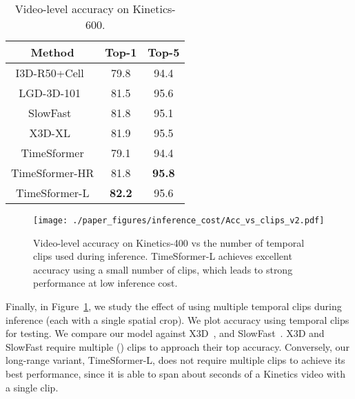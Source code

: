 \documentclass{article}
\begin{document}
 \begin{table}
\centering
{\scriptsize
 \begin{tabular}{c c c }
 \hline
{Method} & {Top-1} & {Top-5} \\ 
 \hline
I3D-R50+Cell~\cite{DBLP:conf/eccv/WangXNPRAKH20} & 79.8 & 94.4\\
LGD-3D-101~\cite{qiu2019learning} & 81.5 & 95.6\\ 
SlowFast~\cite{slowfast} & 81.8 & 95.1\\
X3D-XL~\cite{feichtenhofer2020x3d} & 81.9 & 95.5\\
\hline
TimeSformer & 79.1 & 94.4\\
TimeSformer-HR & 81.8 & \bf 95.8\\
TimeSformer-L & \bf 82.2 & 95.6\\
 \hline
 \end{tabular}
 }
\vspace{-0.1cm}
\caption{{Video-level accuracy on Kinetics-600}.\vspace{-0.1cm}} \label{k600_results_table}
 \end{table}
 
 

\begin{figure}
\begin{center}
\texttt{[image: ./paper\_figures/inference\_cost/Acc\_vs\_clips\_v2.pdf]}
\end{center}
\vspace{-0.4cm}
        \caption{Video-level accuracy on Kinetics-400 vs the number of temporal clips used during inference. TimeSformer-L achieves excellent accuracy using a small number of clips, which leads to strong performance at low inference cost.\vspace{-0.0cm}}
\label{inference_cost_fig}
\end{figure}





Finally, in Figure~\ref{inference_cost_fig}, we study the effect of using multiple temporal clips during inference (each with a single spatial crop). We plot accuracy using  temporal clips for testing. We compare our model against X3D~\cite{feichtenhofer2020x3d}, and SlowFast~\cite{slowfast}. X3D and SlowFast require multiple () clips to approach their top accuracy. Conversely, our long-range variant, TimeSformer-L, does not require multiple clips to achieve its best performance, since it is able to span about  seconds of a Kinetics video with a single clip. 
\end{document}

